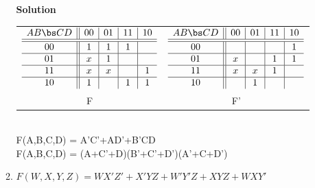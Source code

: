 \begin{enumerate}
\begin{enumerate}
                \begin{onlysolution}  \textbf{Solution} \itshape{

                        \begin{tabular}{cc}
                            $
                            \begin{array} {c||c|c|c|c}
                                A B \bs C D   & 00 & 01 & 11 & 10 \\ \hline \hline
                                00        & 1  & 1  & 1  &    \\ \hline
                                01        & x  & 1  &    &    \\ \hline
                                11        & x  & x  &    & 1  \\ \hline
                                10        & 1  &    & 1  & 1  \\
                            \end{array}$ &
                            $
                            \begin{array} {c||c|c|c|c}
                                A B \bs C D   & 00 & 01 & 11 & 10 \\ \hline \hline
                                00        &    &    &    & 1  \\ \hline
                                01        & x  &    & 1  & 1  \\ \hline
                                11        & x  & x  & 1  &    \\ \hline
                                10        &    & 1  &    &    \\
                            \end{array}$ \\
                            F  & F' \\
                        \end{tabular} \\
                        \SOPmin F(A,B,C,D) =  A'C'+AD'+B'CD\\
                        \POSmin F(A,B,C,D) =  (A+C'+D)(B'+C'+D')(A'+C+D')
                    }
                \end{onlysolution}
            \item  $F(W,X,Y,Z) = WX'Z' + X'YZ + W'Y'Z + XYZ + WXY'$


\end{enumerate}
\end{enumerate}
